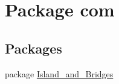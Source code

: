 \hypertarget{namespacecom}{}\section{Package com}
\label{namespacecom}
\subsection*{Packages}
\begin{DoxyCompactItemize}
\item 
package \mbox{\hyperlink{namespacecom_1_1_island__and___bridges}{Island\+\_\+and\+\_\+\+Bridges}}
\end{DoxyCompactItemize}
